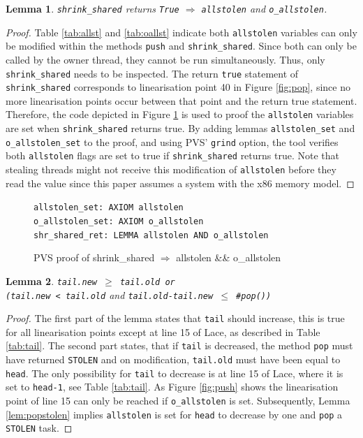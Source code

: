 \documentclass{sig-alternate-br}
\newtheorem{lemma}{Lemma}
\begin{document}
\begin{lemma}
	\texttt{shrink\_shared} returns \texttt{True} $\Rightarrow$ \texttt{allstolen} and \texttt{o\_allstolen}.
	\label{lem:shrinkshared}
\end{lemma}
\begin{proof}
	Table \ref{tab:allst} and \ref{tab:oallst} indicate both \texttt{allstolen} variables can only be modified within the methods \texttt{push} and \texttt{shrink\_shared}. Since both can only be called by the owner thread, they cannot be run simultaneously.  Thus, only \texttt{shrink\_shared} needs to be inspected. The return \texttt{true} statement of \texttt{shrink\_shared} corresponds to linearisation point 40 in Figure \ref{fig:pop}, since no more linearisation points occur between that point and the return true statement. Therefore, the code depicted in Figure \ref{pvs:shrshared} is used to proof the \texttt{allstolen} variables are set when \texttt{shrink\_shared} returns true. By adding lemmas \texttt{allstolen\_set} and \texttt{o\_allstolen\_set} to the proof, and using PVS' \texttt{grind} option, the tool verifies both \texttt{allstolen} flags are set to true if \texttt{shrink\_shared} returns true. Note that stealing threads might not receive this modification of \texttt{allstolen} before they read the value since this paper assumes a system with the x86 memory model.
\end{proof}
\begin{figure}
	\texttt{allstolen\_set: AXIOM allstolen}\\
	\texttt{o\_allstolen\_set: AXIOM o\_allstolen}\\
	\texttt{shr\_shared\_ret: LEMMA allstolen AND o\_allstolen}
	\caption{PVS proof of shrink\_shared $\Rightarrow$ allstolen \&\& o\_allstolen}
	\label{pvs:shrshared}
\end{figure}

\begin{lemma}
	\texttt{tail.new $\geq$ tail.old or\\(tail.new < tail.old} and \texttt{tail.old-tail.new $\leq$ \#pop())}
\end{lemma}
\begin{proof}
	The first part of the lemma states that \texttt{tail} should increase, this is true for all linearisation points except at line 15 of Lace, as described in Table \ref{tab:tail}.
	The second part states, that if \texttt{tail} is decreased, the method \texttt{pop} must have returned \texttt{STOLEN} and on modification, \texttt{tail.old} must have been equal to \texttt{head}.
	The only possibility for \texttt{tail} to decrease is at line 15 of Lace, where it is set to \texttt{head-1}, see Table \ref{tab:tail}.
	As Figure \ref{fig:push} shows the linearisation point of line 15 can only be reached if \texttt{o\_allstolen} is set.
	Subsequently, Lemma \ref{lem:popstolen} implies \texttt{allstolen} is set for \texttt{head} to decrease by one and \texttt{pop} a \texttt{STOLEN} task.
	
\end{proof}
\end{document}
